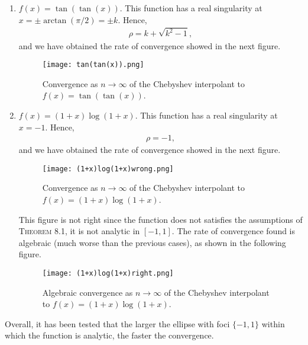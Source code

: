 \begin{enumerate}[label=\alph*)]
\item $f(x) = \tan(\tan(x))$. This function has a real singularity at $x=\pm \arctan(\pi/2)=\pm k$. Hence, 
\begin{align*}
\rho = k+\sqrt{k^2-1},
\end{align*}
and we have obtained the rate of convergence showed in the next figure.
\begin{figure}[H]
\centering
\texttt{[image: tan(tan(x)).png]}\caption{Convergence as $n\rightarrow\infty$ of the Chebyshev interpolant to $f(x)= \tan(\tan(x))$.}
\end{figure}

\item $f(x) = (1+x)\log(1+x)$. This function has a real singularity at $x=-1$. Hence, 
\begin{align*}
\rho = -1,
\end{align*}
and we have obtained the rate of convergence showed in the next figure.
\begin{figure}[H]
\centering
\texttt{[image: (1+x)log(1+x)wrong.png]}\caption{Convergence as $n\rightarrow\infty$ of the Chebyshev interpolant to $f(x)= (1+x)\log(1+x)$.}
\end{figure}
This figure is not right since the function does not satisfies the assumptions of \newline \textsc{Theorem 8.1}, it is not analytic in $[-1,1]$. The rate of convergence found is algebraic (much worse than the previous cases), as shown in the following figure.

\begin{figure}[H]
\centering
\texttt{[image: (1+x)log(1+x)right.png]}\caption{Algebraic convergence as $n\rightarrow\infty$ of the Chebyshev interpolant to \newline $f(x)= (1+x)\log(1+x)$.}
\end{figure}
\end{enumerate}

Overall, it has been tested that the larger the ellipse with foci $\{-1,1\}$ within which the function is analytic, the faster the convergence.
